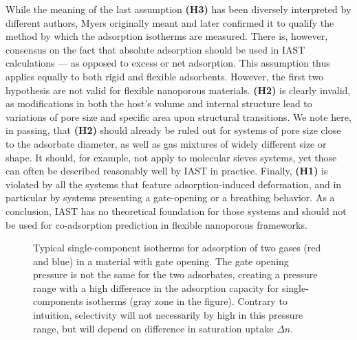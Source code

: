 \documentclass[thesis]{subfiles}
\begin{document}
While the meaning of the last assumption \textbf{(H3)} has been diversely
interpreted by different authors, Myers\cite{Myers1965} originally meant and
later confirmed\cite{Myers2014} it to qualify the method by which the adsorption
isotherms are measured. There is, however, consensus on the fact that absolute
adsorption should be used in IAST calculations --- as opposed to excess or net
adsorption\cite{Brandani2016}. This assumption thus applies equally to both
rigid and flexible adsorbents. However, the first two hypothesis are not valid
for flexible nanoporous materials. \textbf{(H2)} is clearly invalid, as
modifications in both the host's volume and internal structure lead to
variations of pore size and specific area upon structural transitions. We note
here, in passing, that \textbf{(H2)} should already be ruled out for systems of
pore size close to the adsorbate diameter, as well as gas mixtures of widely
different size or shape.  It should, for example, not apply to molecular sieves
systems, yet those can often be described reasonably well by IAST in practice.
Finally, \textbf{(H1)} is violated by all the systems that feature
adsorption-induced deformation, and in particular by systems presenting a
gate-opening or a breathing behavior. As a conclusion, IAST has no theoretical
foundation for those systems and should not be used for co-adsorption prediction
in flexible nanoporous frameworks.

\begin{figure}[htp]
    \centering
    
    \caption{Typical single-component isotherms for adsorption of two gases (red
    and blue) in a material with gate opening. The gate opening pressure is not
    the same for the two adsorbates, creating a pressure range with a high
    difference in the adsorption capacity for single-components isotherms (gray
    zone in the figure). Contrary to intuition, selectivity will not necessarily
    by high in this pressure range, but will depend on difference in saturation
    uptake $\Delta n$.}
    \label{fig:open-close-selectivity}
\end{figure}
\end{document}
